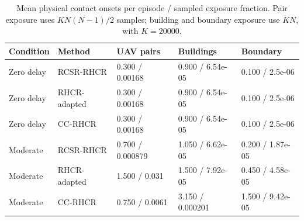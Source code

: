 \begin{table}[!t]
\centering\small
\caption{Mean physical contact onsets per episode / sampled exposure fraction. Pair exposure uses $KN(N-1)/2$ samples; building and boundary exposure use $KN$, with $K=20000$.}
\label{tab:contacts}
\begin{tabular}{lllll}
\toprule
Condition & Method & UAV pairs & Buildings & Boundary \\ \midrule
Zero delay & RCSR-RHCR & 0.300 / 0.00168 & 0.900 / 6.54e-05 & 0.100 / 2.5e-06 \\
Zero delay & RHCR-adapted & 0.300 / 0.00168 & 0.900 / 6.54e-05 & 0.100 / 2.5e-06 \\
Zero delay & CC-RHCR & 0.300 / 0.00168 & 0.900 / 6.54e-05 & 0.100 / 2.5e-06 \\
Moderate & RCSR-RHCR & 0.700 / 0.000879 & 1.050 / 6.62e-05 & 0.200 / 1.87e-05 \\
Moderate & RHCR-adapted & 1.500 / 0.031 & 1.500 / 7.92e-05 & 0.450 / 4.58e-05 \\
Moderate & CC-RHCR & 0.750 / 0.0061 & 3.150 / 0.000201 & 1.500 / 9.42e-05 \\
\bottomrule
\end{tabular}
\end{table}
